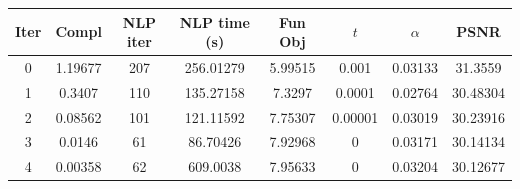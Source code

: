 \begin{tabular}{c c c c c c c c}
\toprule
Iter & Compl & NLP iter & NLP time (s) & Fun Obj & $t$ & $\alpha$ & PSNR \\
\midrule
0 & 1.19677 & 207 & 256.01279 & 5.99515 & 0.001 & 0.03133 & 31.3559 \\
1 & 0.3407 & 110 & 135.27158 & 7.3297 & 0.0001 & 0.02764 & 30.48304 \\
2 & 0.08562 & 101 & 121.11592 & 7.75307 & 0.00001 & 0.03019 & 30.23916 \\
3 & 0.0146 & 61 & 86.70426 & 7.92968 & 0 & 0.03171 & 30.14134 \\
4 & 0.00358 & 62 & 609.0038 & 7.95633 & 0 & 0.03204 & 30.12677 \\
\bottomrule
\end{tabular}